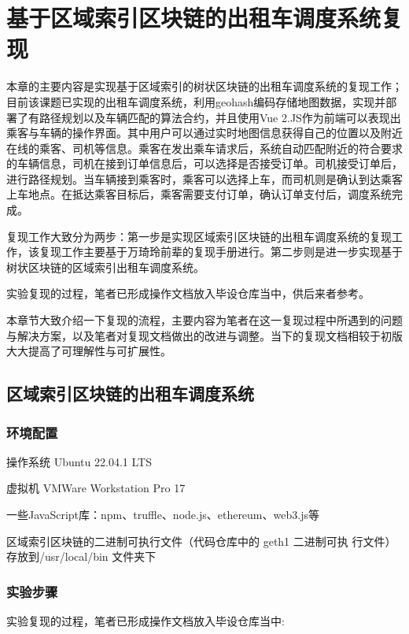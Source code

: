 
\chapter{基于区域索引区块链的出租车调度系统复现}
本章的主要内容是实现基于区域索引的树状区块链的出租车调度系统的复现工作；目前该课题已实现的出租车调度系统，利用geohash编码存储地图数据，实现并部署了有路径规划以及车辆匹配的算法合约，并且使用Vue 2.JS作为前端可以表现出乘客与车辆的操作界面。其中用户可以通过实时地图信息获得自己的位置以及附近在线的乘客、司机等信息。乘客在发出乘车请求后，系统自动匹配附近的符合要求的车辆信息，司机在接到订单信息后，可以选择是否接受订单。司机接受订单后，进行路径规划。当车辆接到乘客时，乘客可以选择上车，而司机则是确认到达乘客上车地点。在抵达乘客目标后，乘客需要支付订单，确认订单支付后，调度系统完成。

复现工作大致分为两步：第一步是实现区域索引区块链的出租车调度系统的复现工作，该复现工作主要基于万琦玲前辈的复现手册进行。第二步则是进一步实现基于树状区块链的区域索引出租车调度系统。

实验复现的过程，笔者已形成操作文档放入毕设仓库当中，供后来者参考。
 
本章节大致介绍一下复现的流程，主要内容为笔者在这一复现过程中所遇到的问题与解决方案，以及笔者对复现文档做出的改进与调整。当下的复现文档相较于初版大大提高了可理解性与可扩展性。

\section{区域索引区块链的出租车调度系统}

\subsection{环境配置}

操作系统 Ubuntu 22.04.1 LTS

虚拟机 VMWare Workstation Pro 17
	
一些JavaScript库：npm、truffle、node.js、ethereum、web3.js等 

区域索引区块链的二进制可执行文件（代码仓库中的 geth1 二进制可执
行文件）存放到/usr/local/bin 文件夹下

\subsection{实验步骤}

实验复现的过程，笔者已形成操作文档放入毕设仓库当中:

